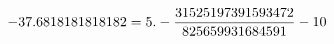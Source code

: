 \documentclass[preview]{standalone}
\begin{document}
\begin{align*}
\special{dvisvgm:raw <g id='unique000'>}-37.6818181818182 = 5.- \frac{31525197391593472}{825659931684591} - 10\special{dvisvgm:raw </g>}
\end{align*}
\end{document}
